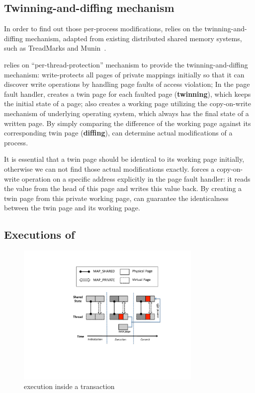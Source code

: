 \subsection{Twinning-and-diffing mechanism}
\label{sec:twinning-and-diffing}
In order to find out those per-process modifications, 
\sheriff{} relies on  the twinning-and-diffing mechanism, 
adapted from existing distributed shared memory systems, such as 
TreadMarks and Munin~\cite{dsm:munin, dsm:treadmarks}.

\sheriff{} relies on ``per-thread-protection'' mechanism to provide the twinning-and-diffing mechanism: 
\sheriff{} write-protects all pages of private mappings initially so that it
can discover write operations by handling page faults of access violation;
In the page fault handler, \sheriff{} creates a twin page for each faulted page (\textbf{twinning}), 
which keeps the initial state of a page;
\sheriff{} also creates a working page utilizing the copy-on-write mechanism of underlying 
operating system, which always has the final state of a written page. 
By simply comparing the difference of the working page against its corresponding twin page 
(\textbf{diffing}), 
\sheriff{} can determine actual modifications of a process.
 
It is essential that a twin page should be identical to its working page initially, 
otherwise we can not find those actual modifications exactly. 
\sheriff{} forces a copy-on-write operation on a specific address explicitly in the page fault handler:
it reads the value from the head of this page and writes this value back. 
By creating a twin page from this private working page, \sheriff{} can guarantee the identicalness between the twin page and its working page.
 
\subsection{Executions of \sheriff{}}
\label{sec:sheriff-execution}

\begin{figure}[!t] 
\centering
\includegraphics[width=3.5in]{sheriff/figure/sheriffframework.pdf}
\caption{\sheriff{} execution inside a transaction
\label{fig:sheriffoverview}}
\end{figure} 

